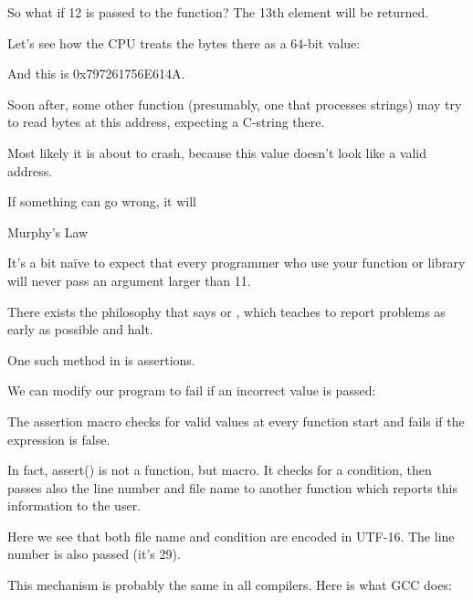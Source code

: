 So what if 12 is passed to the function?
The 13th element will be returned.

Let's see how the CPU treats the bytes there as a 64-bit value:



And this is 0x797261756E614A.

Soon after, some other function (presumably, one that processes strings) may try to read bytes at 
this address, expecting a C-string there.

Most likely it is about to crash, because this value doesn't look like a valid address.


\epigraph{If something can go wrong, it will}{Murphy's Law}

It's a bit naïve to expect that every programmer who use your function or library will never pass
an argument larger than 11.

There exists the philosophy that says  or , 
which teaches to report problems as early as possible and halt.

One such method in \CCpp is assertions.

We can modify our program to fail if an incorrect value is passed:



The assertion macro checks for valid values at every function start and fails if the expression is false.



In fact, assert() is not a function, but macro. It checks for a condition, then passes also the line number and file
name to another function which reports this information to the user.

Here we see that both file name and condition are encoded in UTF-16.
The line number is also passed (it's 29).

This mechanism is probably the same in all compilers.
Here is what GCC does:



